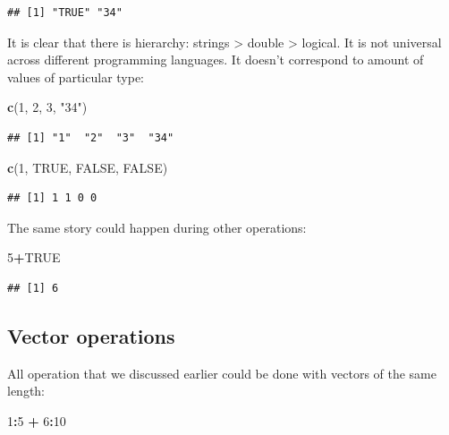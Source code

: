 \documentclass[
]{book}
\newenvironment{Shaded}{\begin{snugshade}}{\end{snugshade}}
\newcommand{\DecValTok}[1]{\textcolor[rgb]{0.00,0.00,0.81}{#1}}
\newcommand{\KeywordTok}[1]{\textcolor[rgb]{0.13,0.29,0.53}{\textbf{#1}}}
\newcommand{\NormalTok}[1]{#1}
\newcommand{\OperatorTok}[1]{\textcolor[rgb]{0.81,0.36,0.00}{\textbf{#1}}}
\newcommand{\OtherTok}[1]{\textcolor[rgb]{0.56,0.35,0.01}{#1}}
\newcommand{\StringTok}[1]{\textcolor[rgb]{0.31,0.60,0.02}{#1}}
\begin{document}
\begin{verbatim}
## [1] "TRUE" "34"
\end{verbatim}

It is clear that there is hierarchy: strings \textgreater{} double \textgreater{} logical. It is not universal across different programming languages. It doesn't correspond to amount of values of particular type:

\begin{Shaded}
\begin{Highlighting}[]
\KeywordTok{c}\NormalTok{(}\DecValTok{1}\NormalTok{, }\DecValTok{2}\NormalTok{, }\DecValTok{3}\NormalTok{, }\StringTok{"34"}\NormalTok{)}
\end{Highlighting}
\end{Shaded}

\begin{verbatim}
## [1] "1"  "2"  "3"  "34"
\end{verbatim}

\begin{Shaded}
\begin{Highlighting}[]
\KeywordTok{c}\NormalTok{(}\DecValTok{1}\NormalTok{, }\OtherTok{TRUE}\NormalTok{, }\OtherTok{FALSE}\NormalTok{, }\OtherTok{FALSE}\NormalTok{)}
\end{Highlighting}
\end{Shaded}

\begin{verbatim}
## [1] 1 1 0 0
\end{verbatim}

The same story could happen during other operations:

\begin{Shaded}
\begin{Highlighting}[]
\DecValTok{5}\OperatorTok{+}\OtherTok{TRUE}
\end{Highlighting}
\end{Shaded}

\begin{verbatim}
## [1] 6
\end{verbatim}

\hypertarget{vector-operations}{%
\subsection{Vector operations}\label{vector-operations}}

All operation that we discussed earlier could be done with vectors of the same length:

\begin{Shaded}
\begin{Highlighting}[]
\DecValTok{1}\OperatorTok{:}\DecValTok{5} \OperatorTok{+}\StringTok{ }\DecValTok{6}\OperatorTok{:}\DecValTok{10}
\end{Highlighting}
\end{Shaded}
\end{document}
